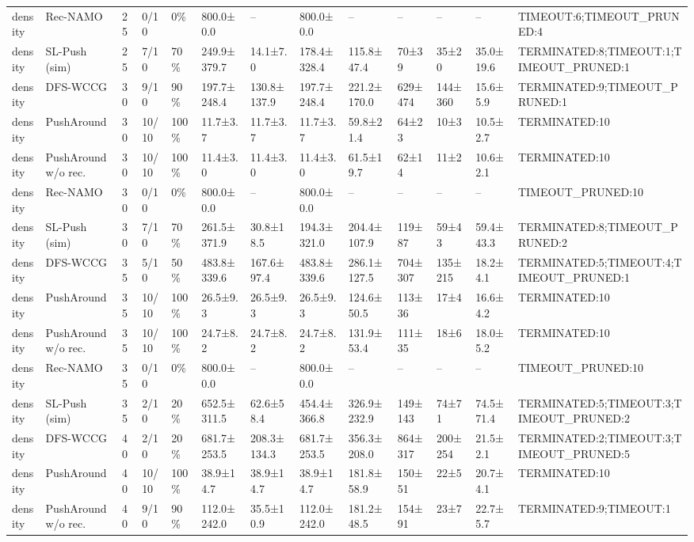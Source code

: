 \begin{tabular}{lllllllllllll}
density & Rec-NAMO & 25 & 0/10 & 0\% & 800.0±0.0 & -- & 800.0±0.0 & -- & -- & -- & -- & TIMEOUT:6;TIMEOUT\_PRUNED:4 \\
density & SL-Push (sim) & 25 & 7/10 & 70\% & 249.9±379.7 & 14.1±7.0 & 178.4±328.4 & 115.8±47.4 & 70±39 & 35±20 & 35.0±19.6 & TERMINATED:8;TIMEOUT:1;TIMEOUT\_PRUNED:1 \\
density & DFS-WCCG & 30 & 9/10 & 90\% & 197.7±248.4 & 130.8±137.9 & 197.7±248.4 & 221.2±170.0 & 629±474 & 144±360 & 15.6±5.9 & TERMINATED:9;TIMEOUT\_PRUNED:1 \\
density & PushAround & 30 & 10/10 & 100\% & 11.7±3.7 & 11.7±3.7 & 11.7±3.7 & 59.8±21.4 & 64±23 & 10±3 & 10.5±2.7 & TERMINATED:10 \\
density & PushAround w/o rec. & 30 & 10/10 & 100\% & 11.4±3.0 & 11.4±3.0 & 11.4±3.0 & 61.5±19.7 & 62±14 & 11±2 & 10.6±2.1 & TERMINATED:10 \\
density & Rec-NAMO & 30 & 0/10 & 0\% & 800.0±0.0 & -- & 800.0±0.0 & -- & -- & -- & -- & TIMEOUT\_PRUNED:10 \\
density & SL-Push (sim) & 30 & 7/10 & 70\% & 261.5±371.9 & 30.8±18.5 & 194.3±321.0 & 204.4±107.9 & 119±87 & 59±43 & 59.4±43.3 & TERMINATED:8;TIMEOUT\_PRUNED:2 \\
density & DFS-WCCG & 35 & 5/10 & 50\% & 483.8±339.6 & 167.6±97.4 & 483.8±339.6 & 286.1±127.5 & 704±307 & 135±215 & 18.2±4.1 & TERMINATED:5;TIMEOUT:4;TIMEOUT\_PRUNED:1 \\
density & PushAround & 35 & 10/10 & 100\% & 26.5±9.3 & 26.5±9.3 & 26.5±9.3 & 124.6±50.5 & 113±36 & 17±4 & 16.6±4.2 & TERMINATED:10 \\
density & PushAround w/o rec. & 35 & 10/10 & 100\% & 24.7±8.2 & 24.7±8.2 & 24.7±8.2 & 131.9±53.4 & 111±35 & 18±6 & 18.0±5.2 & TERMINATED:10 \\
density & Rec-NAMO & 35 & 0/10 & 0\% & 800.0±0.0 & -- & 800.0±0.0 & -- & -- & -- & -- & TIMEOUT\_PRUNED:10 \\
density & SL-Push (sim) & 35 & 2/10 & 20\% & 652.5±311.5 & 62.6±58.4 & 454.4±366.8 & 326.9±232.9 & 149±143 & 74±71 & 74.5±71.4 & TERMINATED:5;TIMEOUT:3;TIMEOUT\_PRUNED:2 \\
density & DFS-WCCG & 40 & 2/10 & 20\% & 681.7±253.5 & 208.3±134.3 & 681.7±253.5 & 356.3±208.0 & 864±317 & 200±254 & 21.5±2.1 & TERMINATED:2;TIMEOUT:3;TIMEOUT\_PRUNED:5 \\
density & PushAround & 40 & 10/10 & 100\% & 38.9±14.7 & 38.9±14.7 & 38.9±14.7 & 181.8±58.9 & 150±51 & 22±5 & 20.7±4.1 & TERMINATED:10 \\
density & PushAround w/o rec. & 40 & 9/10 & 90\% & 112.0±242.0 & 35.5±10.9 & 112.0±242.0 & 181.2±48.5 & 154±91 & 23±7 & 22.7±5.7 & TERMINATED:9;TIMEOUT:1 \\

\end{tabular}

